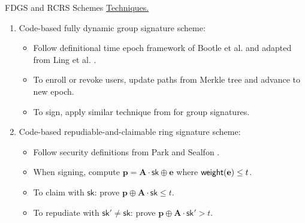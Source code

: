 \begin{frame}{FDGS and RCRS Schemes}
	\underline{Techniques.}\pause
	\begin{enumerate}
		\item Code-based fully dynamic group signature scheme:\pause
		\begin{itemize}
			\item Follow definitional time epoch framework of Bootle et al. \cite{BootleCCGG16} and adapted from Ling et al. \cite{LingNWX17}.\pause
			\item To enroll or revoke users, update paths from Merkle tree and advance to new epoch.\pause
			\item To sign, apply similar technique from \cite{NguyenTWZ19eprint} for group signatures.\pause
		\end{itemize}
		\item Code-based repudiable-and-claimable ring signature scheme:\pause
		\begin{itemize}
			\item Follow security definitions from Park and Sealfon \cite{ParkS19}.\pause
			\item When signing, compute $\mathbf{p} = \mathbf{A}\cdot \textsf{sk} \oplus \mathbf{e}$ where $\mathsf{weight}(\mathbf{e}) \leq t$.\pause
			\item To claim with $\textsf{sk}$: prove $\mathbf{p} \oplus \mathbf{A}\cdot\textsf{sk} \leq t$. \pause
			\item To repudiate with $\textsf{sk}'\not= \textsf{sk}$: prove $\mathbf{p} \oplus\mathbf{A}\cdot\textsf{sk}' > t$.
		\end{itemize}
	\end{enumerate}
\end{frame}